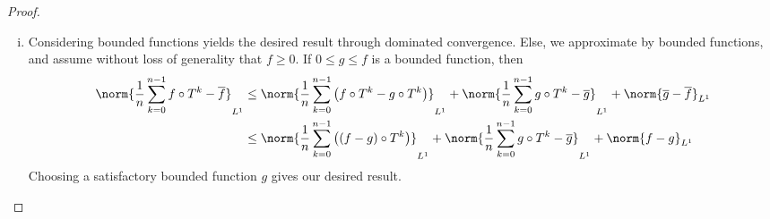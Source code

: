 \documentclass[10pt]{mypackage}
\begin{document}
\begin{proof}
\begin{enumerate}[(i)]
      it follows that
      \begin{align*}
        \left\vert \int_{A_{n,k}}^{} f\:d\mu - \int_{A_{n,k}}^{} \overline{f}\:d\mu \right\vert &\leq \frac{1}{2^{n}} \mu\left( A_{n,k} \right).
      \end{align*}
      Summing over $k$ gives
      \begin{align*}
        \left\vert \int_{A}^{} f\:d\mu - \int_{A}^{} \overline{f}\:d\mu\right\vert &\leq \frac{1}{2^{n}} \mu\left( A \right).
      \end{align*}
      Choosing $n$ sufficiently large gives the desired result.
    \item Considering bounded functions yields the desired result through dominated convergence. Else, we approximate by bounded functions, and assume without loss of generality that $f\geq 0$. If $0\leq g \leq f$ is a bounded function, then
      \begin{align*}
          \norm{\frac{1}{n}\sum_{k=0}^{n-1}f\circ T^{k} - \overline{f}}_{L^1} &\leq \norm{\frac{1}{n}\sum_{k=0}^{n-1}\left( f\circ T^{k} - g\circ T^{k} \right)}_{L^1} + \norm{\frac{1}{n}\sum_{k=0}^{n-1} g\circ T^{k} - \overline{g}}_{L^1} + \norm{ \overline{g} - \overline{f} }_{L^1}\\
                              &\leq \norm{\frac{1}{n}\sum_{k=0}^{n-1}\left( \left( f-g \right)\circ T^{k} \right)}_{L^1} + \norm{\frac{1}{n}\sum_{k=0}^{n-1} g\circ T^{k} - \overline{g}}_{L^1} + \norm{ f - g }_{L^1}
      \end{align*}
      Choosing a satisfactory bounded function $g$ gives our desired result.
  \end{enumerate}
\end{proof}
\end{document}
